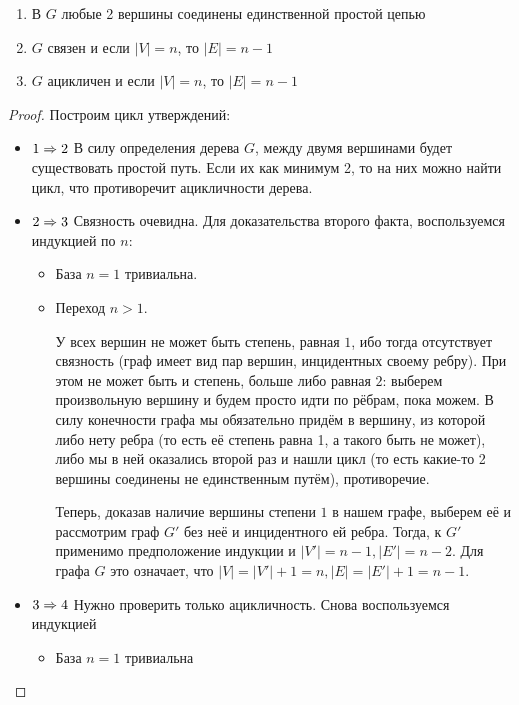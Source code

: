 \begin{multicols}{2}
\begin{theorema}{}{}
\begin{enumerate}
        \item В $G$ любые 2 вершины соединены единственной простой цепью
        
        \item $G$ связен и если $|V| = n$, то $|E| = n - 1$
        
        \item $G$ ацикличен и если $|V| = n$, то $|E| = n - 1$
      \end{enumerate}
    \end{theorema}
    
    \begin{proof}
      Построим цикл утверждений:
      \begin{itemize}
        \item $1 \Rightarrow 2$ В силу определения дерева $G$, между двумя вершинами будет существовать простой путь. Если их как минимум 2, то на них можно найти цикл, что противоречит ацикличности дерева.
        
        \item $2 \Rightarrow 3$ Связность очевидна. Для доказательства второго факта, воспользуемся индукцией по $n$:
        \begin{itemize}
          \item База $n = 1$ тривиальна.
          
          \item Переход $n > 1$.
          
          У всех вершин не может быть степень, равная $1$, ибо тогда отсутствует связность (граф имеет вид пар вершин, инцидентных своему ребру). При этом не может быть и степень, больше либо равная $2$: выберем произвольную вершину и будем просто идти по рёбрам, пока можем. В силу конечности графа мы обязательно придём в вершину, из которой либо нету ребра (то есть её степень равна 1, а такого быть не может), либо мы в ней оказались второй раз и нашли цикл (то есть какие-то 2 вершины соединены не единственным путём), противоречие.
          
          Теперь, доказав наличие вершины степени $1$ в нашем графе, выберем её и рассмотрим граф $G'$ без неё и инцидентного ей ребра. Тогда, к $G'$ применимо предположение индукции и $|V'| = n - 1, |E'| = n - 2$. Для графа $G$ это означает, что $|V| = |V'| + 1 = n, |E| = |E'| + 1 = n - 1$.
        \end{itemize}
      
        \item $3 \Rightarrow 4$ Нужно проверить только ацикличность. Снова воспользуемся индукцией
        \begin{itemize}
          \item База $n = 1$ тривиальна
          

\end{itemize}
\end{itemize}
\end{proof}
\end{multicols}
